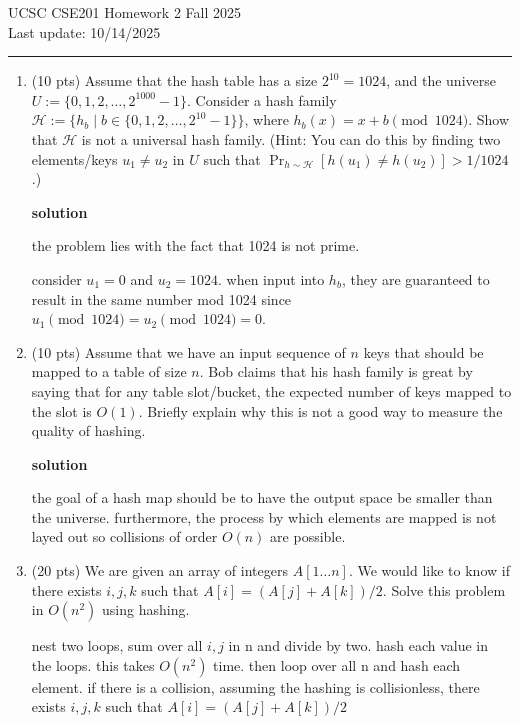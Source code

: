 \documentclass[letterpaper,12pt]{article}
\begin{document}
\noindent
 UCSC CSE201 Homework 2 \hfill Fall 2025 \\
Last update: 10/14/2025 \\
 \rule{\textwidth}{0.5pt}

%

\enlargethispage*{1.5cm}





\begin{enumerate}


\item (10 pts) Assume that the hash table has a size $2^{10} = 1024$, and the universe $U := \{0, 1, 2, \ldots, 2^{1000}-1\}$. Consider a hash family $\mathcal{H}:= \{ h_b \; | \; b \in \{0, 1, 2, \ldots, 2^{10} -1\}\}$, where $h_b(x) = x + b \pmod{1024}$. Show that $\mathcal{H}$ is not a universal hash family. (Hint: You can do this by finding two elements/keys $u_1 \neq u_2$ in $U$ such that $\Pr_{h \sim \mathcal{H}} [ h(u_1) \neq h(u_2)] > 1/ 1024$.) 

\textbf{solution}

the problem lies with the fact that 1024 is not prime. 

consider \(u_1=0\) and \(u_2=1024\). when input into \(h_b\), they are guaranteed to result in the same number mod 1024 since \(u_1 \pmod {1024} = u_2 \pmod {1024} = 0\). 


\newpage
\item (10 pts) Assume that we have an input sequence of $n$ keys that should be mapped to a table of size $n$. Bob claims that his hash family is great by saying that for any table slot/bucket, the expected number of keys mapped to the slot is $O(1)$. Briefly explain why this is not a good way to measure the quality of hashing.


\textbf{solution}

the goal of a hash map should be to have the output space be smaller than the universe. furthermore, the process by which elements are mapped is not layed out so collisions of order \(O(n)\) are possible. 
\newpage


\item (20 pts) We are given an array of integers $A[1 \ldots n]$. We would like to know if there exists $i, j, k$ such that $A[i] = (A[j] + A[k])/2$. Solve this problem in $O(n^2)$ using hashing. 

nest two loops, sum over all \(i,j\) in n and divide by two. hash each value in the loops. this takes \(O(n^2)\) time. then loop over all n and hash each element. if there is a collision, assuming the hashing is collisionless, there exists \(i,j,k\) such that $A[i] = (A[j] + A[k])/2$


\end{enumerate}
\end{document}
